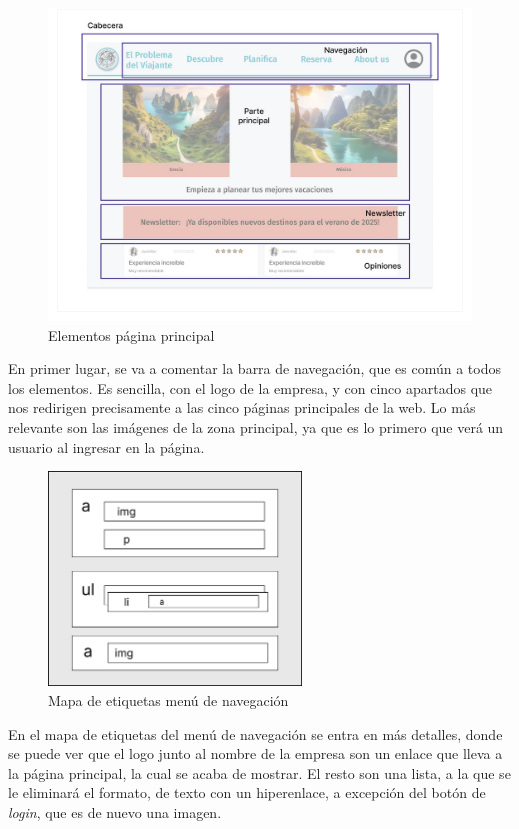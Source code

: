 \documentclass[11pt, a4paper]{book}
\begin{document}
	\begin{figure} [H]
		\centering
		\includegraphics[width=\textwidth]{HTML/Doc-principal.jpg}
		\caption{Elementos página principal}
	\end{figure}

	En primer lugar, se va a comentar la barra de navegación, que es común a todos los elementos. Es sencilla, con el logo de la empresa, y con cinco apartados que nos redirigen precisamente a las cinco páginas principales de la web. Lo más relevante son las imágenes de la zona principal, ya que es lo primero que verá un usuario al ingresar en la página. 
	
	\begin{figure} [H]
		\centering
		\includegraphics[width=0.6\textwidth]{HTML/Etiq-nav.jpg}
		\caption{Mapa de etiquetas menú de navegación}
	\end{figure}
	
	En el mapa de etiquetas del menú de navegación se entra en más detalles, donde se puede ver que el logo junto al nombre de la empresa son un enlace que lleva a la página principal, la cual se acaba de mostrar. El resto son una lista, a la que se le eliminará el formato, de texto con un hiperenlace, a excepción del botón de \textit{login}, que es de nuevo una imagen.
	
\end{document}
